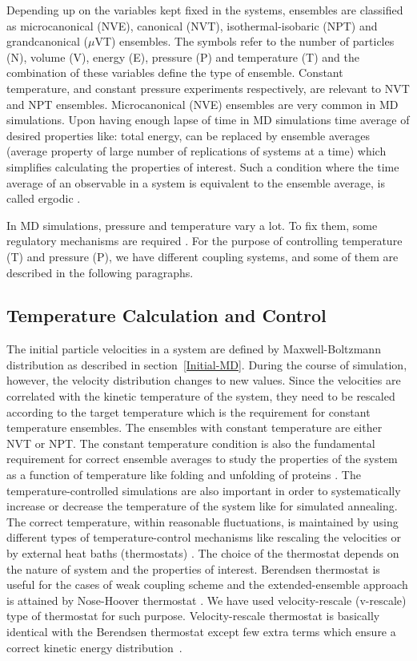 Depending up on the variables kept fixed in the systems, ensembles are classified as microcanonical (NVE), canonical (NVT), isothermal-isobaric (NPT) and grandcanonical ($\mu$VT) ensembles. The symbols refer to the number of particles (N), volume (V), energy (E), pressure (P) and temperature (T) and the combination of these variables define the type of ensemble. Constant temperature, and constant pressure experiments respectively, are relevant to NVT and NPT ensembles. Microcanonical (NVE) ensembles are very common in MD simulations. Upon 
having enough lapse of time in MD simulations time average of desired properties like: total energy, can be replaced by ensemble averages (average property of large number of replications of systems at a time) which simplifies calculating the properties of interest. Such a condition where the time average of an observable in a system is equivalent to the ensemble average, is called ergodic \citep{Leach2001}. 

In MD simulations, pressure and temperature vary a lot. To fix them, some regulatory mechanisms are required \citep{Leach2001}. For the purpose of controlling temperature (T) and pressure (P), we have different coupling systems, and some of them are described in the following paragraphs. 
\subsection{Temperature Calculation and Control} \label{thermostat}
The initial particle velocities in a system are defined by Maxwell-Boltzmann distribution as described in section~\ref{Initial-MD}. During the course of simulation, however, the velocity distribution changes to new values. Since the velocities are correlated with the kinetic temperature of the system, they need to be rescaled according to the target temperature which is the requirement for constant temperature ensembles. The ensembles with constant temperature are either NVT or NPT. The constant temperature condition is also the fundamental requirement for correct ensemble averages to study the properties of the system as a function of temperature like folding and unfolding  of proteins \citep{Leach2001}. The temperature-controlled simulations are also important in order to systematically increase or decrease the temperature of the system like for simulated annealing. The correct temperature, within reasonable fluctuations, is maintained by using different types of temperature-control mechanisms like rescaling the velocities or by external heat baths (thermostats) \citep{Frenkel2002}. The choice of the thermostat depends on the nature of system and the properties of interest. Berendsen thermostat is useful for the cases of weak coupling scheme \citep{Berendsen1984} and the extended-ensemble approach is attained by Nose-Hoover thermostat \citep{Nose1984, Hoover1985}. We have used velocity-rescale (v-rescale) type of thermostat for such purpose. Velocity-rescale thermostat is basically identical with the Berendsen thermostat except few extra terms which ensure a correct kinetic energy distribution~\citep{Gromacs-manual}.

